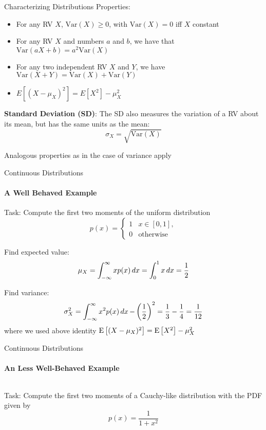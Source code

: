 {\begin{frame}{Characterizing Distributions}
        Properties:
        \begin{itemize}
            \item For any RV $X$, $\mathrm{Var}(X) \ge 0$, with $\mathrm{Var}(X) = 0$ iff $X$ constant
            \item For any RV $X$ and numbers $a$ and $b$, we have that $\mathrm{Var}(aX+b) = a^2\mathrm{Var}(X)$
            \item For any two independent RV $X$ and $Y$, we have $\mathrm{Var}(X+Y) = \mathrm{Var}(X) + \mathrm{Var}(Y)$
            \item $\displaystyle E\left[(X-\mu_X)^2\right] = E[X^2] - \mu_X^2$
        \end{itemize}

        \begin{boxed}
            \textbf{Standard Deviation (SD)}:
            The SD also measures  the variation of a RV about its mean, but has the same units as the mean:
            $$\sigma_X = \sqrt{\mathrm{Var}(X)}$$
        \end{boxed}
        Analogous properties as in the case of variance apply
    \end{frame}

    \begin{frame}{Continuous Distributions}
        \framesubtitle{A Well Behaved Example}

        Task: Compute the first two moments of the uniform distribution
        $$
            p(x) = \begin{cases}
                1 & x \in [0,1],     \\
                0 & \text{otherwise}
            \end{cases}
        $$
        \vspace*{5mm}

        Find expected value:
        $$\mu_X = \int_{-\infty}^\infty xp(x) \mathop{dx} = \int_0^1 x \mathop{dx} = \frac{1}{2}$$

        Find variance:
        $$\sigma_X^2 = \int_{-\infty}^\infty x^2p(x) \mathop{dx} - \left(\frac{1}{2}\right)^2
            = \frac{1}{3} - \frac{1}{4} = \frac{1}{12}
        $$
        where we used above identity $\operatorname{E}\left[(X-\mu_X)^2\right] = \operatorname{E}\left[X^2\right] - \mu_X^2$
    \end{frame}

    \begin{frame}{Continuous Distributions}
        \framesubtitle{An Less Well-Behaved Example}

        \begin{columns}[onlytextwidth]
            \begin{column}{0.55\textwidth}
                Task: Compute the first two moments of a Cauchy-like distribution with the PDF given by
                $$p(x) = \frac{1}{1+x^2}$$
                \vspace*{3mm}


\end{column}
\end{columns}
\end{frame}}

